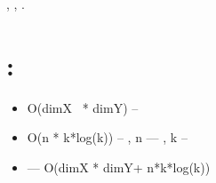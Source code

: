 \documentclass[a4paper]{article}
\newcommand\liststyleLvi{%
\renewcommand\labelitemi{{\textbullet}}
\renewcommand\labelitemii{${\circ}$}
\renewcommand\labelitemiii{${\blacksquare}$}
\renewcommand\labelitemiv{{\textbullet}}
}
\begin{document}
{
{\CYRV} {\cyrc}{\cyre}{\cyrl}{\cyrya}{\cyrh} {\cyra}{\cyrn}{\cyra}{\cyrl}{\cyri}{\cyrz}{\cyra}
{\cyrerev}{\cyrf}{\cyrf}{\cyre}{\cyrk}{\cyrt}{\cyri}{\cyrv}{\cyrn}{\cyro}{\cyrs}{\cyrt}{\cyri}
{\cyra}{\cyrl}{\cyrg}{\cyro}{\cyrr}{\cyri}{\cyrt}{\cyrm}{\cyra}, {\cyrb}{\cyrery}{\cyrl}{\cyra}
{\cyrp}{\cyrr}{\cyro}{\cyrv}{\cyre}{\cyrd}{\cyre}{\cyrn}{\cyra}
{\cyra}{\cyrn}{\cyra}{\cyrl}{\cyri}{\cyrt}{\cyri}{\cyrch}{\cyre}{\cyrs}{\cyrk}{\cyra}{\cyrya}
{\cyro}{\cyrc}{\cyre}{\cyrn}{\cyrk}{\cyra} {\cyra}{\cyrl}{\cyrg}{\cyro}{\cyrr}{\cyri}{\cyrt}{\cyrm}{\cyro}{\cyrv},
{\cyra} {\cyrt}{\cyra}{\cyrk}{\cyrzh}{\cyre}
{\cyrp}{\cyrr}{\cyra}{\cyrk}{\cyrt}{\cyri}{\cyrch}{\cyre}{\cyrs}{\cyrk}{\cyri}
{\cyrerev}{\cyrk}{\cyrs}{\cyrp}{\cyre}{\cyrr}{\cyri}{\cyrm}{\cyre}{\cyrn}{\cyrt}{\cyrery}.}

\section{{\CYRA}{\cyrn}{\cyra}{\cyrl}{\cyri}{\cyrt}{\cyri}{\cyrch}{\cyre}{\cyrs}{\cyrk}{\cyra}{\cyrya}
{\cyrs}{\cyrl}{\cyro}{\cyrzh}{\cyrn}{\cyro}{\cyrs}{\cyrt}{\cyrsftsn}
{\cyra}{\cyrl}{\cyrg}{\cyro}{\cyrr}{\cyri}{\cyrt}{\cyrm}{\cyra} {\cyrd}{\cyrl}{\cyrya}
{\cyrp}{\cyro}{\cyrs}{\cyrl}{\cyre}{\cyrd}{\cyro}{\cyrv}{\cyra}{\cyrt}{\cyre}{\cyrl}{\cyrsftsn}{\cyrn}{\cyro}{\cyrg}{\cyro}
{\cyrs}{\cyrl}{\cyru}{\cyrch}{\cyra}{\cyrya}:}
\liststyleLvi
\begin{itemize}
\item {
O(dimX \ * dimY) -- \foreignlanguage{russian}{{\cyrs}{\cyrl}{\cyro}{\cyrzh}{\cyrn}{\cyro}{\cyrs}{\cyrt}{\cyrsftsn}
{\cyrd}{\cyrl}{\cyrya} {\cyrm}{\cyra}{\cyrr}{\cyrk}{\cyri}{\cyrr}{\cyro}{\cyrv}{\cyrk}{\cyri}
{\cyrk}{\cyro}{\cyrm}{\cyrp}{\cyro}{\cyrn}{\cyre}{\cyrn}{\cyrt}
{\cyrb}{\cyri}{\cyrn}{\cyra}{\cyrr}{\cyrn}{\cyro}{\cyrg}{\cyro}
{\cyri}{\cyrz}{\cyro}{\cyrb}{\cyrr}{\cyra}{\cyrzh}{\cyre}{\cyrn}{\cyri}{\cyrya}}}
\item {
O(n * k*log(k)) -- \foreignlanguage{russian}{{\cyrs}{\cyrl}{\cyro}{\cyrzh}{\cyrn}{\cyro}{\cyrs}{\cyrt}{\cyrsftsn}
{\cyrd}{\cyrl}{\cyrya} {\cyra}{\cyrl}{\cyrg}{\cyro}{\cyrr}{\cyri}{\cyrt}{\cyrm}{\cyra}
{\CYRG}{\cyrr}{\cyrerev}{\cyrh}{\cyre}{\cyrm}{\cyra}, {\cyrg}{\cyrd}{\cyre} }n ---\foreignlanguage{russian}{
{\cyrch}{\cyri}{\cyrs}{\cyrl}{\cyro} {\cyrk}{\cyro}{\cyrm}{\cyrp}{\cyro}{\cyrn}{\cyre}{\cyrn}{\cyrt}, }k --
\foreignlanguage{russian}{{\cyrs}{\cyrr}{\cyre}{\cyrd}{\cyrn}{\cyre}{\cyre}
{\cyrk}{\cyro}{\cyrl}{\cyri}{\cyrch}{\cyre}{\cyrs}{\cyrt}{\cyrv}{\cyro} {\cyrt}{\cyro}{\cyrch}{\cyre}{\cyrk} {\cyrv}
{\cyrk}{\cyro}{\cyrm}{\cyrp}{\cyro}{\cyrn}{\cyre}{\cyrn}{\cyrt}{\cyre}}}
\item {
\foreignlanguage{russian}{{\CYRI}{\cyrt}{\cyro}{\cyrg}{\cyro}{\cyrv}{\cyra}{\cyrya}
{\cyrs}{\cyrl}{\cyro}{\cyrzh}{\cyrn}{\cyro}{\cyrs}{\cyrt}{\cyrsftsn}
{\cyra}{\cyrl}{\cyrg}{\cyro}{\cyrr}{\cyri}{\cyrt}{\cyrm}{\cyra} --- }O(dimX * dimY+ n*k*log(k))}
\end{itemize}
\end{document}
